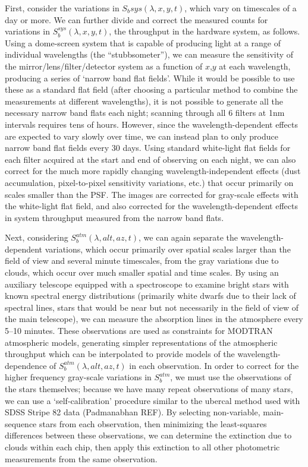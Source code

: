 \documentclass[12pt,preprint]{aastex}
\begin{document}
First, consider the variations in $S_b{sys}(\lambda,x,y,t)$, which
vary on timescales of a day or more.  We can further divide and
correct the measured counts for variations in
$S_b^{sys}(\lambda,x,y,t)$, the throughput in the hardware system, as
follows. Using a dome-screen system that is capable of producing light
at a range of individual wavelengths (the ``stubbsometer''), we can
measure the sensitivity of the mirror/lens/filter/detector system as a
function of $x$,$y$ at each wavelength, producing a series of `narrow
band flat fields'. While it would be possible to use these as a
standard flat field (after choosing a particular method to combine the
measurements at different wavelengths), it is not possible to generate
all the necessary narrow band flats each night; scanning through all 6
filters at 1nm intervals requires tens of hours. However, since the
wavelength-dependent effects are expected to vary slowly over time, we
can instead plan to only produce narrow band flat fields every 30
days. Using standard white-light flat fields for each filter acquired
at the start and end of observing on each night, we can also correct
for the much more rapidly changing wavelength-independent effects
(dust accumulation, pixel-to-pixel sensitivity variations, etc.) that
occur primarily on scales smaller than the PSF. The images are
corrected for gray-scale effects with the white-light flat field, and
also corrected for the wavelength-dependent effects in system
throughput measured from the narrow band flats.

Next, considering $S_b^{atm}(\lambda,alt,az,t)$, we can again
separate the wavelength-dependent variations, which occur primarily over
spatial scales larger than the field of view and several minute timescales, from the gray
variations due to clouds, which occur over much smaller spatial and
time scales. By using an auxiliary telescope equipped with a
spectroscope to examine bright stars with known spectral energy
distributions (primarily white dwarfs due to their lack of spectral
lines, stars that would be near but not necessarily in the field of
view of the main telescope), we can measure the absorption lines in
the atmosphere every 5--10 minutes. These observations are used as
constraints for MODTRAN atmospheric models, generating simpler
representations of the atmospheric throughput which can be
interpolated to provide models of the wavelength-dependence of
$S_b^{atm}(\lambda,alt,az,t)$ in each observation. In order to correct
for the higher frequency gray-scale variations in $S_b^{atm}$, we must
use the observations of the stars themselves; because we have many repeat
observations of many stars, we can use a `self-calibration' procedure
similar to the ubercal method used with SDSS Stripe 82 data
(Padmanabhan REF). By selecting non-variable, main-sequence stars
from each observation, then minimizing the least-squares differences
between these observations, we can determine the extinction due to
clouds within each chip, then apply this extinction to all other
photometric measurements from the same observation. 
\end{document}
